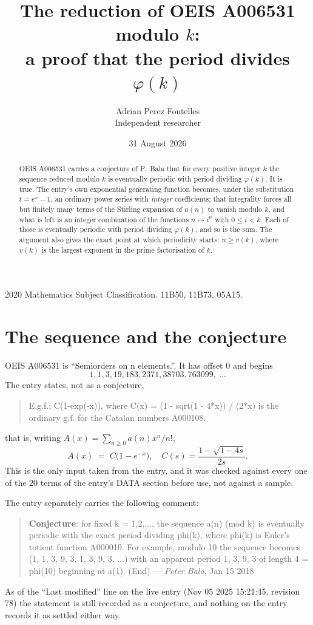 \documentclass[11pt,a4paper]{article}
\title{The reduction of OEIS A006531 modulo $k$:\\ a proof that the period divides
$\varphi(k)$}
\author{Adrian Perez Fontelles\\ \small Independent researcher}
\date{31 August 2026}
\theoremstyle{plain}
\theoremstyle{definition}
\begin{document}
\maketitle

\begin{abstract}
OEIS A006531 carries a conjecture of P.~Bala that for every positive integer $k$ the
sequence reduced modulo $k$ is eventually periodic with period dividing $\varphi(k)$.
It is true. The entry's own exponential generating function becomes, under the
substitution $t=e^{x}-1$, an ordinary power series with \emph{integer} coefficients;
that integrality forces all but finitely many terms of the Stirling expansion of $a(n)$
to vanish modulo $k$, and what is left is an integer combination of the functions
$n\mapsto i^{n}$ with $0\le i<k$. Each of those is eventually periodic with period
dividing $\varphi(k)$, and so is the sum. The argument also gives the exact point at
which periodicity starts: $n\ge v(k)$, where $v(k)$ is the largest exponent in the
prime factorisation of $k$.
\end{abstract}

\noindent\small 2020 Mathematics Subject Classification. 11B50, 11B73, 05A15.\normalsize

\section{The sequence and the conjecture}

OEIS A006531 is ``Semiorders on n elements.''. It has offset $0$ and begins
\[
1, 1, 3, 19, 183, 2371, 38703, 763099,\ \dots
\]
The entry states, not as a conjecture,
\begin{quote}\small
E.g.f.: C(1-exp(-x)), where C(x) = (1 - sqrt(1 - 4*x)) / (2*x) is the ordinary g.f. for the Catalan numbers A000108.
\end{quote}
that is, writing $A(x)=\sum_{n\ge 0}a(n)x^{n}/n!$,
\begin{equation}\label{eq:egf}
A(x)\;=\;C\bigl(1-e^{-x}\bigr),\quad C(s)=\frac{1-\sqrt{1-4s}}{2s}.
\end{equation}
This is the only input taken from the entry, and it was checked against every one of the
$20$ terms of the entry's DATA section before use, not against a sample.

The entry separately carries the following comment:
\begin{quote}\small
\textbf{Conjecture}: for fixed k = 1,2,..., the sequence a(n) (mod k) is eventually periodic with the exact period dividing phi(k), where phi(k) is Euler's totient function A000010. For example, modulo 10 the sequence becomes (1, 1, 3, 9, 3, 1, 3, 9, 3, ...) with an apparent period 1, 3, 9, 3 of length 4 = phi(10) beginning at a(1). (End) --- \emph{Peter Bala}, Jan 15 2018
\end{quote}
As of the ``Last modified'' line on the live entry (Nov 05 2025 15:21:45, revision
78) the statement is still recorded as a conjecture, and nothing on the entry
records it as settled either way.
\end{document}
